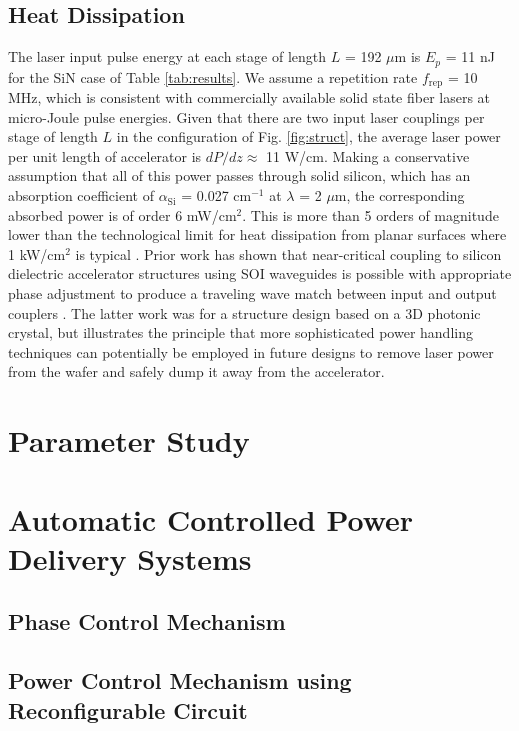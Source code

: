 \subsection{Heat Dissipation}
The laser input pulse energy at each stage of length $L$ = 192 $\mu$m is $E_p$ = 11 nJ for the SiN case of Table \ref{tab:results}.
 We assume a repetition rate $f_\text{rep}$ = 10 MHz, which is consistent with commercially available solid state fiber lasers at micro-Joule pulse energies.
 Given that there are two input laser couplings per stage of length $L$ in the configuration of Fig.
\ref{fig:struct}, the average laser power per unit length of accelerator is $dP/dz \approx$ 11 W/cm.
 Making a conservative assumption that all of this power passes through solid silicon, which has an absorption coefficient of $\alpha_\text{Si}$ = 0.027 $\text{cm}^{-1}$ at $\lambda$ = 2 $\mu$m, the corresponding absorbed power is of order 6 mW/$\text{cm}^2$.
 This is more than 5 orders of magnitude lower than the technological limit for heat dissipation from planar surfaces where 1 kW/$\text{cm}^2$ is typical \cite{eggleston:1984,rutherford:2000}.
 Prior work has shown that near-critical coupling to silicon dielectric accelerator structures using SOI waveguides is possible with appropriate phase adjustment to produce a traveling wave match between input and output couplers \cite{wu:2014}.
 The latter work was for a structure design based on a 3D photonic crystal, but illustrates the principle that more sophisticated power handling techniques can potentially be employed in future designs to remove laser power from the wafer and safely dump it away from the accelerator.

\section{Parameter Study}

\section{Automatic Controlled Power Delivery Systems}

\subsection{Phase Control Mechanism}

\subsection{Power Control Mechanism using Reconfigurable Circuit}

